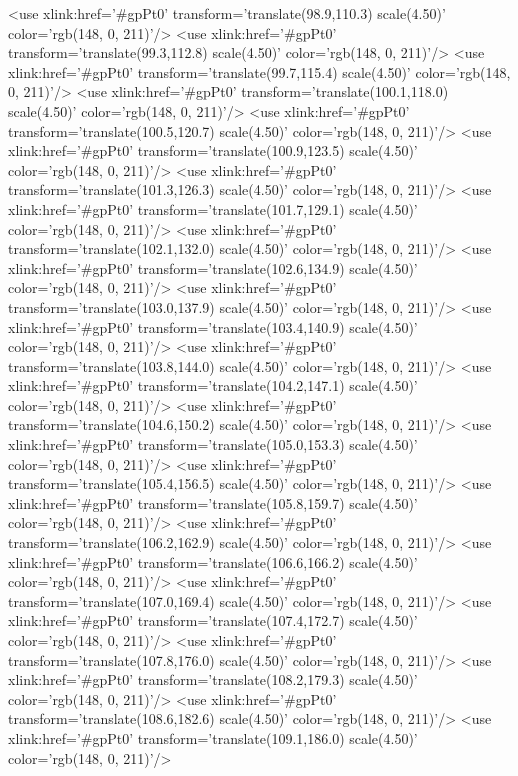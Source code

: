 	<use xlink:href='#gpPt0' transform='translate(98.9,110.3) scale(4.50)' color='rgb(148,   0, 211)'/>
	<use xlink:href='#gpPt0' transform='translate(99.3,112.8) scale(4.50)' color='rgb(148,   0, 211)'/>
	<use xlink:href='#gpPt0' transform='translate(99.7,115.4) scale(4.50)' color='rgb(148,   0, 211)'/>
	<use xlink:href='#gpPt0' transform='translate(100.1,118.0) scale(4.50)' color='rgb(148,   0, 211)'/>
	<use xlink:href='#gpPt0' transform='translate(100.5,120.7) scale(4.50)' color='rgb(148,   0, 211)'/>
	<use xlink:href='#gpPt0' transform='translate(100.9,123.5) scale(4.50)' color='rgb(148,   0, 211)'/>
	<use xlink:href='#gpPt0' transform='translate(101.3,126.3) scale(4.50)' color='rgb(148,   0, 211)'/>
	<use xlink:href='#gpPt0' transform='translate(101.7,129.1) scale(4.50)' color='rgb(148,   0, 211)'/>
	<use xlink:href='#gpPt0' transform='translate(102.1,132.0) scale(4.50)' color='rgb(148,   0, 211)'/>
	<use xlink:href='#gpPt0' transform='translate(102.6,134.9) scale(4.50)' color='rgb(148,   0, 211)'/>
	<use xlink:href='#gpPt0' transform='translate(103.0,137.9) scale(4.50)' color='rgb(148,   0, 211)'/>
	<use xlink:href='#gpPt0' transform='translate(103.4,140.9) scale(4.50)' color='rgb(148,   0, 211)'/>
	<use xlink:href='#gpPt0' transform='translate(103.8,144.0) scale(4.50)' color='rgb(148,   0, 211)'/>
	<use xlink:href='#gpPt0' transform='translate(104.2,147.1) scale(4.50)' color='rgb(148,   0, 211)'/>
	<use xlink:href='#gpPt0' transform='translate(104.6,150.2) scale(4.50)' color='rgb(148,   0, 211)'/>
	<use xlink:href='#gpPt0' transform='translate(105.0,153.3) scale(4.50)' color='rgb(148,   0, 211)'/>
	<use xlink:href='#gpPt0' transform='translate(105.4,156.5) scale(4.50)' color='rgb(148,   0, 211)'/>
	<use xlink:href='#gpPt0' transform='translate(105.8,159.7) scale(4.50)' color='rgb(148,   0, 211)'/>
	<use xlink:href='#gpPt0' transform='translate(106.2,162.9) scale(4.50)' color='rgb(148,   0, 211)'/>
	<use xlink:href='#gpPt0' transform='translate(106.6,166.2) scale(4.50)' color='rgb(148,   0, 211)'/>
	<use xlink:href='#gpPt0' transform='translate(107.0,169.4) scale(4.50)' color='rgb(148,   0, 211)'/>
	<use xlink:href='#gpPt0' transform='translate(107.4,172.7) scale(4.50)' color='rgb(148,   0, 211)'/>
	<use xlink:href='#gpPt0' transform='translate(107.8,176.0) scale(4.50)' color='rgb(148,   0, 211)'/>
	<use xlink:href='#gpPt0' transform='translate(108.2,179.3) scale(4.50)' color='rgb(148,   0, 211)'/>
	<use xlink:href='#gpPt0' transform='translate(108.6,182.6) scale(4.50)' color='rgb(148,   0, 211)'/>
	<use xlink:href='#gpPt0' transform='translate(109.1,186.0) scale(4.50)' color='rgb(148,   0, 211)'/>
